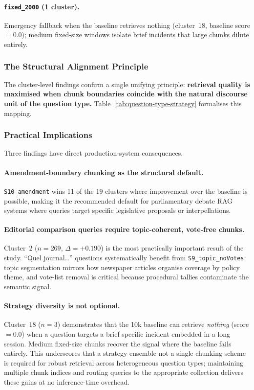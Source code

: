\paragraph{\texttt{fixed\_2000} (1 cluster).}
Emergency fallback when the baseline retrieves nothing (cluster~$18$, baseline
score $= 0.0$); medium fixed-size windows isolate brief incidents that large
chunks dilute entirely.

\subsubsection{The Structural Alignment Principle}

The cluster-level findings confirm a single unifying principle:
\textbf{retrieval quality is maximised when chunk boundaries coincide with the
natural discourse unit of the question type.}
Table~\ref{tab:question-type-strategy} formalises this mapping.


\subsubsection{Practical Implications}

Three findings have direct production-system consequences.

\paragraph{Amendment-boundary chunking as the structural default.}
\texttt{S10\_amendment} wins 11 of the 19 clusters where improvement over the
baseline is possible, making it the recommended default for parliamentary debate
RAG systems where queries target specific legislative proposals or interpellations.

\paragraph{Editorial comparison queries require topic-coherent, vote-free chunks.}
Cluster~$2$ ($n = 269$, $\Delta = +0.190$) is the most practically important
result of the study.
``Quel journal\ldots'' questions systematically benefit from
\texttt{S9\_topic\_noVotes}: topic segmentation mirrors how newspaper articles
organise coverage by policy theme, and vote-list removal is critical because
procedural tallies contaminate the semantic signal.

\paragraph{Strategy diversity is not optional.}
Cluster~$18$ ($n = 3$) demonstrates that the 10k baseline can retrieve
\emph{nothing} (score $= 0.0$) when a question targets a brief specific incident
embedded in a long session.
Medium fixed-size chunks recover the signal where the baseline fails entirely.
This underscores that a strategy ensemble not a single chunking scheme is
required for robust retrieval across heterogeneous question types; maintaining
multiple chunk indices and routing queries to the appropriate collection delivers
these gains at no inference-time overhead.


\clearpage